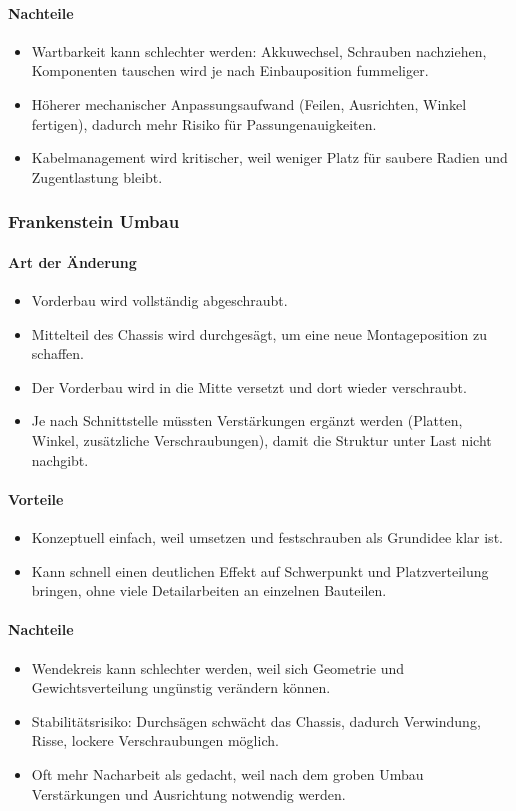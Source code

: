 \paragraph{Nachteile}
\begin{itemize}
  \item Wartbarkeit kann schlechter werden: Akkuwechsel, Schrauben nachziehen, Komponenten tauschen wird je nach Einbauposition fummeliger.
  \item Höherer mechanischer Anpassungsaufwand (Feilen, Ausrichten, Winkel fertigen), dadurch mehr Risiko für Passungenauigkeiten.
  \item Kabelmanagement wird kritischer, weil weniger Platz für saubere Radien und Zugentlastung bleibt.
\end{itemize}

\subsubsection{Frankenstein Umbau}
\label{sec:frankenstein_umbau}
\paragraph{Art der Änderung}
\begin{itemize}
  \item Vorderbau wird vollständig abgeschraubt.
  \item Mittelteil des Chassis wird durchgesägt, um eine neue Montageposition zu schaffen.
  \item Der Vorderbau wird in die Mitte versetzt und dort wieder verschraubt.
  \item Je nach Schnittstelle müssten Verstärkungen ergänzt werden (Platten, Winkel, zusätzliche Verschraubungen), damit die Struktur unter Last nicht nachgibt.
\end{itemize}

\paragraph{Vorteile}
\begin{itemize}
  \item Konzeptuell einfach, weil umsetzen und festschrauben als Grundidee klar ist.
  \item Kann schnell einen deutlichen Effekt auf Schwerpunkt und Platzverteilung bringen, ohne viele Detailarbeiten an einzelnen Bauteilen.
\end{itemize}

\paragraph{Nachteile}
\begin{itemize}
  \item Wendekreis kann schlechter werden, weil sich Geometrie und Gewichtsverteilung ungünstig verändern können.
  \item Stabilitätsrisiko: Durchsägen schwächt das Chassis, dadurch Verwindung, Risse, lockere Verschraubungen möglich.
  \item Oft mehr Nacharbeit als gedacht, weil nach dem groben Umbau Verstärkungen und Ausrichtung notwendig werden.
\end{itemize}

